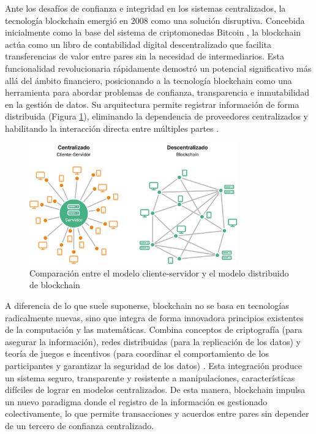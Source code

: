 Ante los desafíos de confianza e integridad en los sistemas centralizados, la tecnología blockchain emergió en 2008 como una solución disruptiva. Concebida inicialmente como la base del sistema de \glspl{criptomoneda} Bitcoin \cite{satoshi2008bitcoin}, la blockchain actúa como un libro de contabilidad digital descentralizado que facilita transferencias de valor entre pares sin la necesidad de intermediarios. Esta funcionalidad revolucionaria rápidamente demostró un potencial significativo más allá del ámbito financiero, posicionando a la tecnología blockchain como una herramienta para abordar problemas de confianza, transparencia e inmutabilidad en la gestión de datos. Su arquitectura permite registrar información de forma distribuida (Figura \ref{fig:web-architecture}), eliminando la dependencia de proveedores centralizados y habilitando la interacción directa entre múltiples partes \cite{bulkowska2023implementation}.

\begin{figure}[!tb] 
    \centering
    \includegraphics[width=0.8\textwidth]{Figures/client-server-vs-p2p.png}
    \caption{Comparación entre el modelo cliente-servidor y el modelo distribuido de blockchain}
    \label{fig:web-architecture}
\end{figure}

A diferencia de lo que suele suponerse, blockchain no se basa en tecnologías radicalmente nuevas, sino que integra de forma innovadora principios existentes de la computación y las matemáticas. Combina conceptos de criptografía (para asegurar la información), redes distribuidas (para la replicación de los datos) y teoría de juegos e incentivos (para coordinar el comportamiento de los participantes y garantizar la seguridad de los datos) \cite{sunny2022systematic, bulkowska2023implementation}. Esta integración produce un sistema seguro, transparente y resistente a manipulaciones, características difíciles de lograr en modelos centralizados. De esta manera, blockchain impulsa un nuevo paradigma donde el registro de la información es gestionado colectivamente, lo que permite transacciones y acuerdos entre pares sin depender de un tercero de confianza centralizado.

